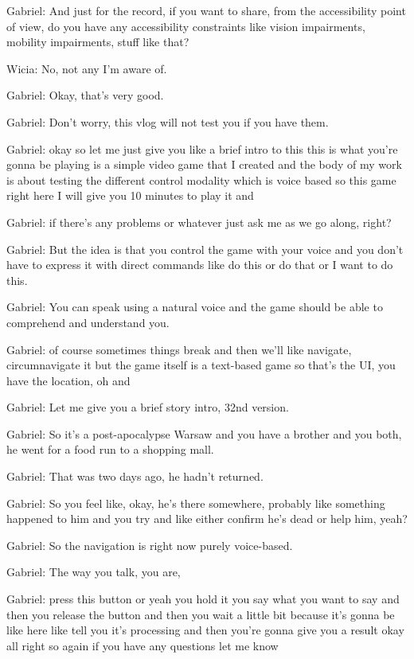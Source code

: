 Gabriel: And just for the record, if you want to share, from the accessibility point of view, do you have any accessibility constraints like vision impairments, mobility impairments, stuff like that?

Wicia: No, not any I'm aware of.

Gabriel: Okay, that's very good.

Gabriel: Don't worry, this vlog will not test you if you have them.

Gabriel: okay so let me just give you like a brief intro to this this is what you're gonna be playing is a simple video game that I created and the body of my work is about testing the different control modality which is voice based so this game right here I will give you 10 minutes to play it and

Gabriel: if there's any problems or whatever just ask me as we go along, right?

Gabriel: But the idea is that you control the game with your voice and you don't have to express it with direct commands like do this or do that or I want to do this.

Gabriel: You can speak using a natural voice and the game should be able to comprehend and understand you.

Gabriel: of course sometimes things break and then we'll like navigate, circumnavigate it but the game itself is a text-based game so that's the UI, you have the location, oh and

Gabriel: Let me give you a brief story intro, 32nd version.

Gabriel: So it's a post-apocalypse Warsaw and you have a brother and you both, he went for a food run to a shopping mall.

Gabriel: That was two days ago, he hadn't returned.

Gabriel: So you feel like, okay, he's there somewhere, probably like something happened to him and you try and like either confirm he's dead or help him, yeah?

Gabriel: So the navigation is right now purely voice-based.

Gabriel: The way you talk, you are,

Gabriel: press this button or yeah you hold it you say what you want to say and then you release the button and then you wait a little bit because it's gonna be like here like tell you it's processing and then you're gonna give you a result okay all right so again if you have any questions let me know

